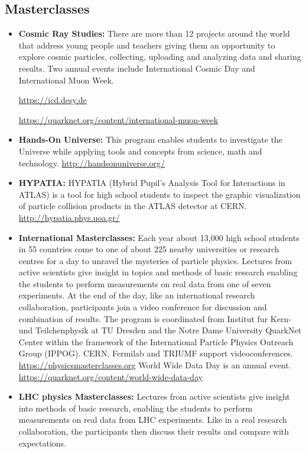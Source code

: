 \subsection{Masterclasses}\label{databases:subsec:edusitesmasterclasses}

\begin{itemize}
\item
  \textbf{Cosmic Ray Studies:} There are more than 12 projects around
  the world that address young people and teachers giving them an
  opportunity to explore cosmic particles, collecting, uploading and
  analyzing data and sharing results. Two annual events include
  International Cosmic Day and International Muon Week.

  \url{https://icd.desy.de}

  \url{https://quarknet.org/content/international-muon-week}
\item
  \textbf{Hands-On Universe:} This program enables students to
  investigate the Universe while applying tools and concepts from
  science, math and technology. \url{http://handsonuniverse.org/}
\item
  \textbf{HYPATIA:} HYPATIA (Hybrid Pupil's Analysis Tool for
  Interactions in ATLAS) is a tool for high school students to inspect
  the graphic visualization of particle collision products in the ATLAS
  detector at CERN. \url{http://hypatia.phys.uoa.gr/}
\item
  \textbf{International Masterclasses:} Each year about 13,000 high
  school students in 55 countries come to one of about 225 nearby
  universities or research centres for a day to unravel the mysteries of
  particle physics. Lectures from active scientists give insight in
  topics and methods of basic research enabling the students to perform
  measurements on real data from one of seven experiments. At the end of
  the day, like an international research collaboration, participants
  join a video conference for discussion and combination of results. The
  program is coordinated from Institut fur Kern- und Teilchenphysik at
  TU Dresden and the Notre Dame University QuarkNet Center within the
  framework of the International Particle Physics Outreach Group
  (IPPOG). CERN, Fermilab and TRIUMF support videoconferences.
  \url{https://physicsmasterclasses.org} World Wide Data Day is an
  annual event. \url{https://quarknet.org/content/world-wide-data-day}
\item
  \textbf{LHC physics Masterclasses:} Lectures from active scientists
  give insight into methods of basic research, enabling the students to
  perform measurements on real data from LHC experiments. Like in a real
  research collaboration, the participants then discuss their results
  and compare with expectations.


\end{itemize}
